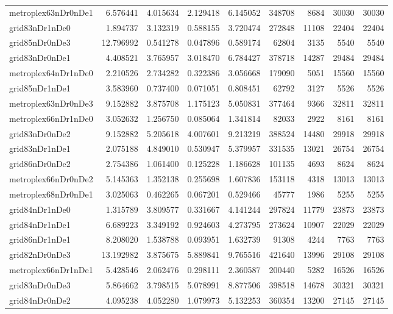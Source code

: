 \begin{longtable}{|l|r|r|r|r|r|r|r|r|}
metroplex63nDr0nDe1 & 6.576441 & 4.015634 & 2.129418 & 6.145052 & 348708 & 8684 & 30030 & 30030 \\
grid83nDr1nDe0 & 1.894737 & 3.132319 & 0.588155 & 3.720474 & 272848 & 11108 & 22404 & 22404 \\
grid85nDr0nDe3 & 12.796992 & 0.541278 & 0.047896 & 0.589174 & 62804 & 3135 & 5540 & 5540 \\
grid83nDr0nDe1 & 4.408521 & 3.765957 & 3.018470 & 6.784427 & 378718 & 14287 & 29484 & 29484 \\
metroplex64nDr1nDe0 & 2.210526 & 2.734282 & 0.322386 & 3.056668 & 179090 & 5051 & 15560 & 15560 \\
grid85nDr1nDe1 & 3.583960 & 0.737400 & 0.071051 & 0.808451 & 62792 & 3127 & 5526 & 5526 \\
metroplex63nDr0nDe3 & 9.152882 & 3.875708 & 1.175123 & 5.050831 & 377464 & 9366 & 32811 & 32811 \\
metroplex66nDr1nDe0 & 3.052632 & 1.256750 & 0.085064 & 1.341814 & 82033 & 2922 & 8161 & 8161 \\
grid83nDr0nDe2 & 9.152882 & 5.205618 & 4.007601 & 9.213219 & 388524 & 14480 & 29918 & 29918 \\
grid83nDr1nDe1 & 2.075188 & 4.849010 & 0.530947 & 5.379957 & 331535 & 13021 & 26754 & 26754 \\
grid86nDr0nDe2 & 2.754386 & 1.061400 & 0.125228 & 1.186628 & 101135 & 4693 & 8624 & 8624 \\
metroplex66nDr0nDe2 & 5.145363 & 1.352138 & 0.255698 & 1.607836 & 153118 & 4318 & 13013 & 13013 \\
metroplex68nDr0nDe1 & 3.025063 & 0.462265 & 0.067201 & 0.529466 & 45777 & 1986 & 5255 & 5255 \\
grid84nDr1nDe0 & 1.315789 & 3.809577 & 0.331667 & 4.141244 & 297824 & 11779 & 23873 & 23873 \\
grid84nDr1nDe1 & 6.689223 & 3.349192 & 0.924603 & 4.273795 & 273624 & 10907 & 22029 & 22029 \\
grid86nDr1nDe1 & 8.208020 & 1.538788 & 0.093951 & 1.632739 & 91308 & 4244 & 7763 & 7763 \\
grid82nDr0nDe3 & 13.192982 & 3.875675 & 5.889841 & 9.765516 & 421640 & 13996 & 29108 & 29108 \\
metroplex66nDr1nDe1 & 5.428546 & 2.062476 & 0.298111 & 2.360587 & 200440 & 5282 & 16526 & 16526 \\
grid83nDr0nDe3 & 5.864662 & 3.798515 & 5.078991 & 8.877506 & 398518 & 14678 & 30321 & 30321 \\
grid84nDr0nDe2 & 4.095238 & 4.052280 & 1.079973 & 5.132253 & 360354 & 13200 & 27145 & 27145 \\

\end{longtable}
